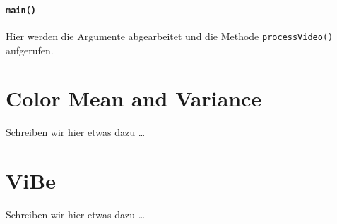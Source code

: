 \documentclass[]{scrartcl}
\begin{document}
\paragraph{\texttt{main()}} Hier werden die Argumente abgearbeitet und die Methode \texttt{processVideo()} aufgerufen.

\section{Color Mean and Variance}\label{sec:cmv}
Schreiben wir hier etwas dazu \dots

\section{ViBe}\label{sec:vibe}
Schreiben wir hier etwas dazu \dots





\end{document}
